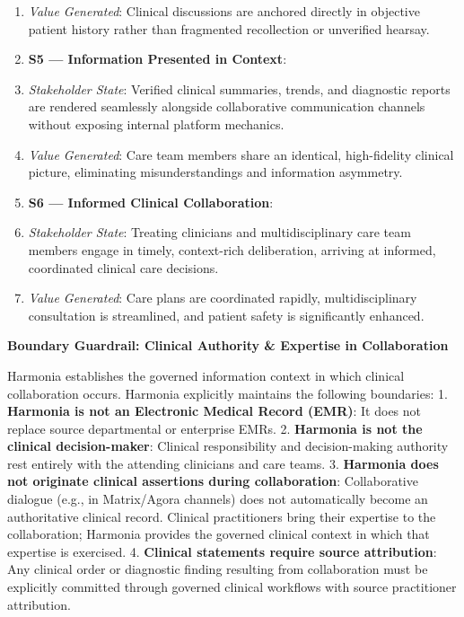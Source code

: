 \begin{enumerate}
\item \emph{Value Generated}: Clinical discussions are anchored directly in objective patient history rather than fragmented recollection or unverified hearsay.

\item \textbf{S5 — Information Presented in Context}:

\item \emph{Stakeholder State}: Verified clinical summaries, trends, and diagnostic reports are rendered seamlessly alongside collaborative communication channels without exposing internal platform mechanics.

\item \emph{Value Generated}: Care team members share an identical, high-fidelity clinical picture, eliminating misunderstandings and information asymmetry.

\item \textbf{S6 — Informed Clinical Collaboration}:

\item \emph{Stakeholder State}: Treating clinicians and multidisciplinary care team members engage in timely, context-rich deliberation, arriving at informed, coordinated clinical care decisions.

\item \emph{Value Generated}: Care plans are coordinated rapidly, multidisciplinary consultation is streamlined, and patient safety is significantly enhanced.

\end{enumerate}


\par\medskip\textbf{Boundary Guardrail: Clinical Authority \& Expertise in Collaboration}\par


Harmonia establishes the governed information context in which clinical collaboration occurs. Harmonia explicitly maintains the following boundaries:
1. \textbf{Harmonia is not an Electronic Medical Record (EMR)}: It does not replace source departmental or enterprise EMRs.
2. \textbf{Harmonia is not the clinical decision-maker}: Clinical responsibility and decision-making authority rest entirely with the attending clinicians and care teams.
3. \textbf{Harmonia does not originate clinical assertions during collaboration}: Collaborative dialogue (e.g., in Matrix/Agora channels) does not automatically become an authoritative clinical record. Clinical practitioners bring their expertise to the collaboration; Harmonia provides the governed clinical context in which that expertise is exercised.
4. \textbf{Clinical statements require source attribution}: Any clinical order or diagnostic finding resulting from collaboration must be explicitly committed through governed clinical workflows with source practitioner attribution.



